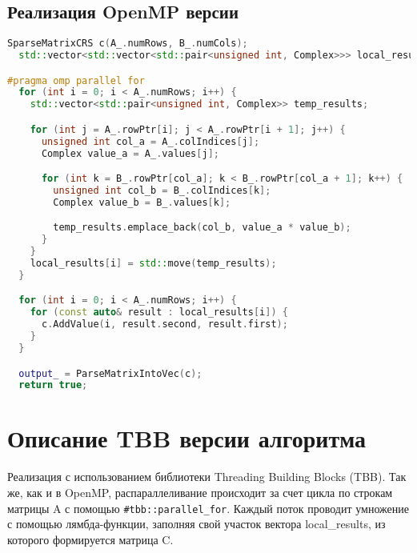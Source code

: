 \documentclass[14pt,a4paper]{extarticle}
\begin{document}
\subsection*{Реализация OpenMP версии}
\begin{lstlisting}[language=C++]
  SparseMatrixCRS c(A_.numRows, B_.numCols);
  std::vector<std::vector<std::pair<unsigned int, Complex>>> local_results(A_.numRows);

#pragma omp parallel for
  for (int i = 0; i < A_.numRows; i++) {
    std::vector<std::pair<unsigned int, Complex>> temp_results;

    for (int j = A_.rowPtr[i]; j < A_.rowPtr[i + 1]; j++) {
      unsigned int col_a = A_.colIndices[j];
      Complex value_a = A_.values[j];

      for (int k = B_.rowPtr[col_a]; k < B_.rowPtr[col_a + 1]; k++) {
        unsigned int col_b = B_.colIndices[k];
        Complex value_b = B_.values[k];

        temp_results.emplace_back(col_b, value_a * value_b);
      }
    }
    local_results[i] = std::move(temp_results);
  }

  for (int i = 0; i < A_.numRows; i++) {
    for (const auto& result : local_results[i]) {
      c.AddValue(i, result.second, result.first);
    }
  }

  output_ = ParseMatrixIntoVec(c);
  return true;

\end{lstlisting}

\section{Описание TBB версии алгоритма}

Реализация с использованием библиотеки Threading Building Blocks (TBB). Так же, как и в OpenMP, распараллеливание происходит за счет цикла по строкам матрицы A с помощью \texttt{\#tbb::parallel\_for}. Каждый поток проводит умножение с помощью лямбда-функции, заполняя свой участок вектора local\_results, из которого формируется матрица C.
\end{document}
